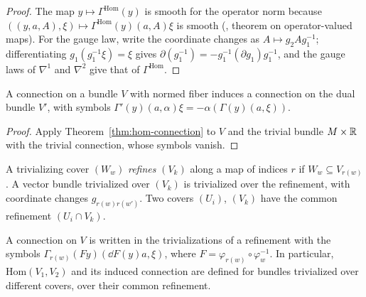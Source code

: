 \begin{proof}
  \leanok
  The map $y \mapsto \Gamma^{\mathrm{Hom}}(y)$ is smooth for the operator norm because
  $((y, a, A), \xi) \mapsto \Gamma^{\mathrm{Hom}}(y)(a, A)\xi$ is smooth (\cite{LCA}, theorem on
  operator-valued maps). For the gauge law, write the coordinate changes as
  $A \mapsto g_2 A g_1^{-1}$; differentiating $g_1(g_1^{-1}\xi) = \xi$ gives
  $\partial(g_1^{-1}) = -g_1^{-1}(\partial g_1)g_1^{-1}$, and the gauge laws of $\nabla^1$ and
  $\nabla^2$ give that of $\Gamma^{\mathrm{Hom}}$.
\end{proof}

\begin{corollary}
  \label{cor:dual-connection}
  \leanok
  A connection on a bundle $V$ with normed fiber induces a connection on the dual bundle $V'$,
  with symbols $\Gamma'(y)(a, \alpha)\xi = -\alpha(\Gamma(y)(a, \xi))$.
\end{corollary}

\begin{proof}
  \leanok
  Apply Theorem~\ref{thm:hom-connection} to $V$ and the trivial bundle $M \times \mathbb{R}$ with the
  trivial connection, whose symbols vanish.
\end{proof}

\begin{definition}[Refinements]
  \label{def:cover-refinement}
  \leanok
  A trivializing cover $(W_w)$ \emph{refines} $(V_k)$ along a map of indices $r$ if
  $W_w \subseteq V_{r(w)}$. A vector bundle trivialized over $(V_k)$ is trivialized over the
  refinement, with coordinate changes $g_{r(w) r(w')}$. Two covers $(U_i)$, $(V_k)$ have the
  common refinement $(U_i \cap V_k)$.
\end{definition}

\begin{theorem}
  \label{thm:refine-connection}
  \leanok
  A connection on $V$ is written in the trivializations of a refinement with the symbols
  $\Gamma_{r(w)}(F y)(\dd F(y) a, \xi)$, where $F = \varphi_{r(w)} \circ \varphi_w^{-1}$. In
  particular, $\mathrm{Hom}(V_1, V_2)$ and its induced connection are defined for bundles
  trivialized over different covers, over their common refinement.
\end{theorem}

